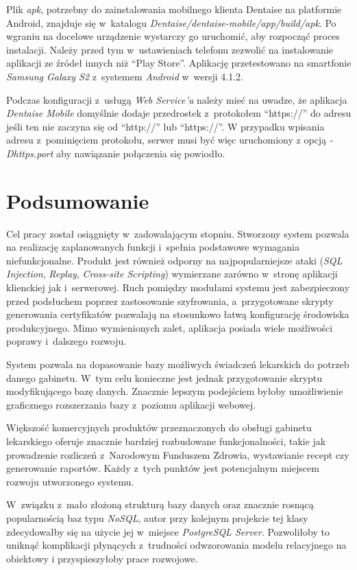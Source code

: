 \documentclass[11pt]{aghdpl}
\begin{document}
Plik \emph{apk}, potrzebny do zainstalowania mobilnego klienta Dentaise na platformie Android, znajduje się w~katalogu \emph{Dentaise/dentaise-mobile/app/build/apk}. Po wgraniu na docelowe urządzenie wystarczy go uruchomić, aby rozpocząć proces instalacji. Należy przed tym w~ustawieniach telefonu zezwolić na instalowanie aplikacji ze źródeł innych niż ``Play Store''. Aplikację przetestowano na smartfonie \emph{Samsung Galaxy S2} z~systemem \emph{Android} w~wersji 4.1.2.

Podczas konfiguracji z~usługą \emph{Web Service'u} należy mieć na uwadze, że aplikacja \emph{Dentaise Mobile} domyślnie dodaje przedrostek z~protokołem ``https://'' do adresu jeśli ten nie zaczyna się od ``http://'' lub ``https://''. W przypadku wpisania adresu z~pominięciem protokołu, serwer musi być więc uruchomiony z opcją \emph{-Dhttps.port} aby nawiązanie połączenia się powiodło.

\chapter{Podsumowanie}

Cel pracy został osiągnięty w~zadowalającym stopniu. Stworzony system pozwala na realizację zaplanowanych funkcji i~spełnia podstawowe wymagania niefunkcjonalne. Produkt jest również odporny na najpopularniejsze ataki (\emph{SQL Injection}, \emph{Replay}, \emph{Cross-site Scripting}) wymierzane zarówno w~stronę aplikacji klienckiej jak i~serwerowej. Ruch pomiędzy modułami systemu jest zabezpieczony przed podsłuchem poprzez zastosowanie szyfrowania, a~przygotowane skrypty generowania certyfikatów pozwalają na stosunkowo łatwą konfigurację środowiska produkcyjnego. Mimo wymienionych zalet, aplikacja posiada wiele możliwości poprawy i~dalszego rozwoju.

System pozwala na dopasowanie bazy możliwych świadczeń lekarskich do potrzeb danego gabinetu. W~tym celu konieczne jest jednak przygotowanie skryptu modyfikującego bazę danych. Znacznie lepszym podejściem byłoby umożliwienie graficznego rozszerzania bazy z~poziomu aplikacji webowej.

Większość komercyjnych produktów przeznaczonych do obsługi gabinetu lekarskiego oferuje znacznie bardziej rozbudowane funkcjonalności, takie jak prowadzenie rozliczeń z~Narodowym Funduszem Zdrowia, wystawianie recept czy generowanie raportów. Każdy z~tych punktów jest potencjalnym miejscem rozwoju utworzonego systemu.

W~związku z~mało złożoną strukturą bazy danych oraz znacznie rosnącą popularnością baz typu \emph{NoSQL}, autor przy kolejnym projekcie tej klasy zdecydowałby się na użycie jej w~miejsce \emph{PostgreSQL Server}. Pozwoliłoby to uniknąć komplikacji płynących z~trudności odwzorowania modelu relacyjnego na obiektowy i przyspieszyłoby prace rozwojowe.
\end{document}
